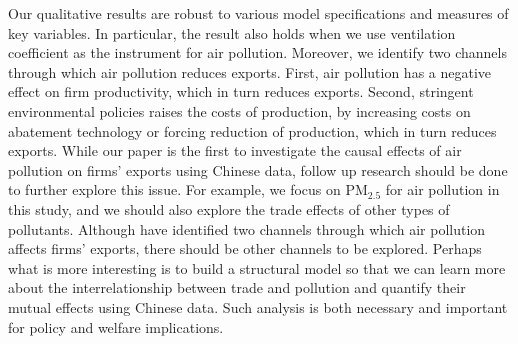 \documentclass[12pt]{article}
\begin{document}
Our qualitative results are robust to various model specifications and measures of key variables. In particular, the result also holds when we use ventilation coefficient as the instrument for air pollution. Moreover, we identify two channels through which air pollution reduces exports. First, air pollution has a negative effect on firm productivity, which in turn reduces exports. Second, stringent environmental policies raises the costs of production, by increasing costs on abatement technology or forcing reduction of production, which in turn reduces exports. While our paper is the first to investigate the causal effects of air pollution on firms' exports using Chinese data, follow up research should be done to further explore this issue. For example, we focus on $\mathrm{PM_{2.5}}$ for air pollution in this study, and we should also explore the trade effects of other types of pollutants. Although have identified two channels through which air pollution affects firms' exports, there should be other channels to be explored. Perhaps what is more interesting is to build a structural model so that we can learn more about the interrelationship between trade and pollution and quantify their mutual effects using Chinese data. Such analysis is both necessary and important for policy and welfare implications.  

\newpage
\small


\end{document}
